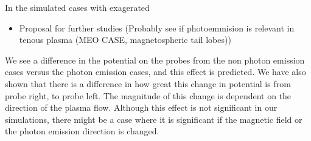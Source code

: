 

In the simulated cases with exagerated 
\begin{itemize}
	\item Proposal for further studies (Probably see if photoemmision is relevant in tenous plasma (MEO CASE, magnetospheric tail lobes))
\end{itemize}

We see a difference in the potential on the probes from the non photon emission cases versus 
the photon emission cases, and this effect is predicted. We have also shown that there 
is a difference in how great this change in potential is from probe right, to probe left.
The magnitude of this change is dependent on the direction of the plasma flow. Although this effect
is not significant in our simulations, there might be a case where it is significant if
the magnetic field or the photon emission direction is changed.